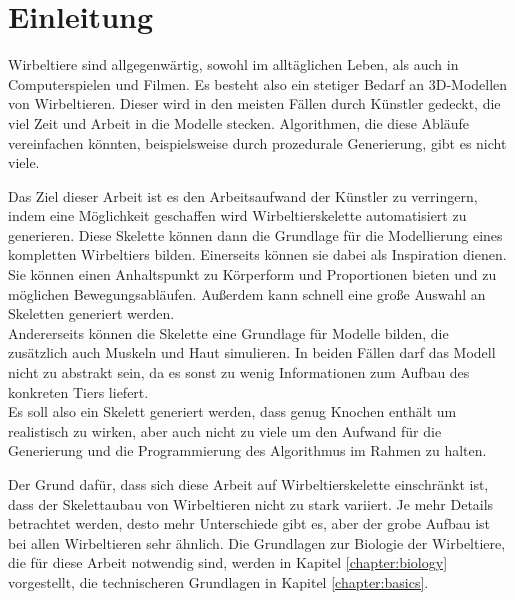 \chapter{Einleitung}

Wirbeltiere sind allgegenwärtig, sowohl im alltäglichen Leben, als auch in Computerspielen und Filmen. Es besteht also ein stetiger Bedarf an 3D-Modellen von Wirbeltieren. Dieser wird in den meisten Fällen durch Künstler gedeckt, die viel Zeit und Arbeit in die Modelle stecken. Algorithmen, die diese Abläufe vereinfachen könnten, beispielsweise durch prozedurale Generierung, gibt es nicht viele.

Das Ziel dieser Arbeit ist es den Arbeitsaufwand der Künstler zu verringern, indem eine Möglichkeit geschaffen wird Wirbeltierskelette automatisiert zu generieren. Diese Skelette können dann die Grundlage für die Modellierung eines kompletten Wirbeltiers bilden.
Einerseits können sie dabei als Inspiration dienen. Sie können einen Anhaltspunkt zu Körperform und Proportionen bieten und zu möglichen Bewegungsabläufen. Außerdem kann schnell eine große Auswahl an Skeletten generiert werden.\\
Andererseits können die Skelette eine Grundlage für Modelle bilden, die zusätzlich auch Muskeln und Haut simulieren.
In beiden Fällen darf das Modell nicht zu abstrakt sein, da es sonst zu wenig Informationen zum Aufbau des konkreten Tiers liefert.\\
Es soll also ein Skelett generiert werden, dass genug Knochen enthält um realistisch zu wirken, aber auch nicht zu viele um den Aufwand für die Generierung und die Programmierung des Algorithmus im Rahmen zu halten.

Der Grund dafür, dass sich diese Arbeit auf Wirbeltierskelette einschränkt ist, dass der Skelettaubau von Wirbeltieren nicht zu stark variiert. 
Je mehr Details betrachtet werden, desto mehr Unterschiede gibt es, aber der grobe Aufbau ist bei allen Wirbeltieren sehr ähnlich. Die Grundlagen zur Biologie der Wirbeltiere, die für diese Arbeit notwendig sind, werden in Kapitel \ref{chapter:biology} vorgestellt, die technischeren Grundlagen in Kapitel \ref{chapter:basics}.


